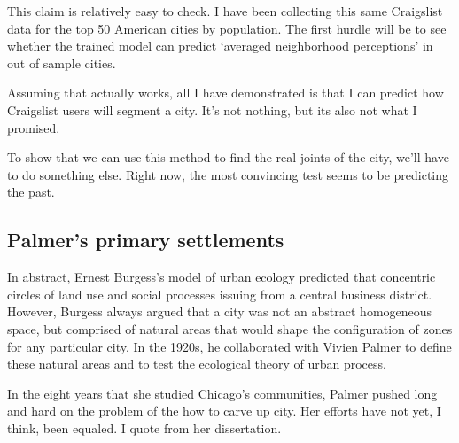 \documentclass{article}
\begin{document}
This claim is relatively easy to check. I have been collecting this
same Craigslist data for the top 50 American cities by population. The
first hurdle will be to see whether the trained model can predict
`averaged neighborhood perceptions' in out of sample cities.

Assuming that actually works, all I have demonstrated is that I can
predict how Craigslist users will segment a city. It's not nothing,
but its also not what I promised.

To show that we can use this method to find the real joints of the
city, we'll have to do something else. Right now, the most convincing
test seems to be predicting the past.

\subsection*{Palmer's primary settlements}
In abstract, Ernest Burgess's model of urban ecology predicted that
concentric circles of land use and social processes issuing from a
central business district. However, Burgess always argued that a city
was not an abstract homogeneous space, but comprised of natural areas
that would shape the configuration of zones for any particular
city. In the 1920s, he collaborated with Vivien Palmer to define these
natural areas and to test the ecological theory of urban process.

In the eight years that she studied Chicago's communities, Palmer
pushed long and hard on the problem of the how to carve up city. Her
efforts have not yet, I think, been equaled. I quote from her
dissertation.
\end{document}
